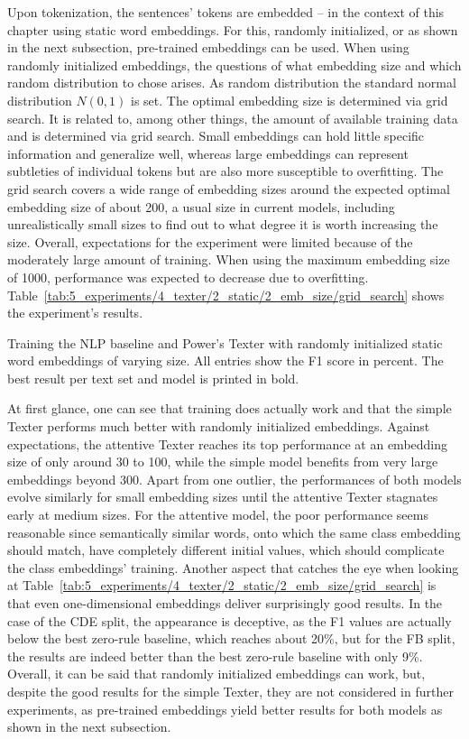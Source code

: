 Upon tokenization, the sentences' tokens are embedded -- in the context of this chapter using static word embeddings. For this, randomly initialized, or as shown in the next subsection, pre-trained embeddings can be used. When using randomly initialized embeddings, the questions of what embedding size and which random distribution to chose arises. As random distribution the standard normal distribution $N(0, 1)$ is set. The optimal embedding size is determined via grid search. It is related to, among other things, the amount of available training data and is determined via grid search. Small embeddings can hold little specific information and generalize well, whereas large embeddings can represent subtleties of individual tokens but are also more susceptible to overfitting. The grid search covers a wide range of embedding sizes around the expected optimal embedding size of about 200, a usual size in current models, including unrealistically small sizes to find out to what degree it is worth increasing the size. Overall, expectations for the experiment were limited because of the moderately large amount of training. When using the maximum embedding size of 1000, performance was expected to decrease due to overfitting. Table~\ref{tab:5_experiments/4_texter/2_static/2_emb_size/grid_search} shows the experiment's results.

\begin{table}[h]
    \centering
    
    \caption{Training the NLP baseline and Power's Texter with randomly initialized static word embeddings of varying size. All entries show the F1 score in percent. The best result per text set and model is printed in bold.}
    \label{tab:5_experiments/4_texter/2_static/2_emb_size/grid_search}
\end{table}

At first glance, one can see that training does actually work and that the simple Texter performs much better with randomly initialized embeddings. Against expectations, the attentive Texter reaches its top performance at an embedding size of only around 30 to 100, while the simple model benefits from very large embeddings beyond 300. Apart from one outlier, the performances of both models evolve similarly for small embedding sizes until the attentive Texter stagnates early at medium sizes. For the attentive model, the poor performance seems reasonable since semantically similar words, onto which the same class embedding should match, have completely different initial values, which should complicate the class embeddings' training. Another aspect that catches the eye when looking at Table~\ref{tab:5_experiments/4_texter/2_static/2_emb_size/grid_search} is that even one-dimensional embeddings deliver surprisingly good results. In the case of the CDE split, the appearance is deceptive, as the F1 values are actually below the best zero-rule baseline, which reaches about 20\%, but for the FB split, the results are indeed better than the best zero-rule baseline with only 9\%. Overall, it can be said that randomly initialized embeddings can work, but, despite the good results for the simple Texter, they are not considered in further experiments, as pre-trained embeddings yield better results for both models as shown in the next subsection.
